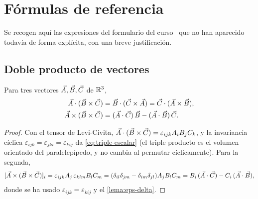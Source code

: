 \appendix
\section{Fórmulas de referencia}\label{sec:apendice}
Se recogen aquí las expresiones del formulario del curso~\cite{FORMULARIO} que
no han aparecido todavía de forma explícita, con una breve justificación.

\subsection{Doble producto de vectores}\label{sec:doble-producto}
\begin{proposicion}\label{prop:doble-producto}
Para tres vectores $\vec{A},\vec{B},\vec{C}$ de $\mathbb{R}^{3}$,
\begin{align}
  \vec{A}\cdot(\vec{B}\times\vec{C})&=\vec{B}\cdot(\vec{C}\times\vec{A})=\vec{C}\cdot(\vec{A}\times\vec{B}), \label{eq:triple-escalar}\\
  \vec{A}\times(\vec{B}\times\vec{C})&=(\vec{A}\cdot\vec{C})\,\vec{B}-(\vec{A}\cdot\vec{B})\,\vec{C}. \label{eq:bac-cab}
\end{align}
\end{proposicion}
\begin{proof}
Con el tensor de Levi-Civita, $\vec{A}\cdot(\vec{B}\times\vec{C})=\varepsilon_{ijk}A_iB_jC_k$, y la
invariancia cíclica $\varepsilon_{ijk}=\varepsilon_{jki}=\varepsilon_{kij}$ da
\eqref{eq:triple-escalar} (el triple producto es el volumen orientado del
paralelepípedo, y no cambia al permutar cíclicamente). Para la segunda,
\[
  [\vec{A}\times(\vec{B}\times\vec{C})]_i=\varepsilon_{ijk}A_j\,\varepsilon_{klm}B_lC_m
  =(\delta_{il}\delta_{jm}-\delta_{im}\delta_{jl})A_jB_lC_m
  =B_i\,(\vec{A}\cdot\vec{C})-C_i\,(\vec{A}\cdot\vec{B}),
\]
donde se ha usado $\varepsilon_{ijk}=\varepsilon_{kij}$ y el \cref{lema:eps-delta}.
\end{proof}

